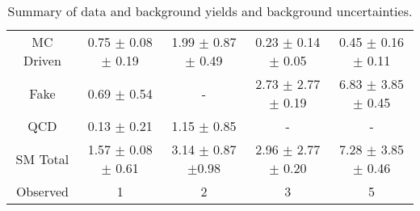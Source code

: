 \begin{table}[!Hhtb]
\begin{center}
\begin{tabular}{c|c|c|c|c}
\hline
\hline
		& \tauTau\binone & \tauTau\bintwo & \eTau & \muTau \\
\hline
MC Driven &  0.75 $\pm$ 0.08 $\pm$ 0.19 & 1.99 $\pm$ 0.87 $\pm$ 0.49  & 0.23 $\pm$ 0.14 $\pm$ 0.05 & 0.45 $\pm$ 0.16  $\pm$ 0.11\\
Fake      &     0.69 $\pm$ 0.54         &           -                 & 2.73 $\pm$ 2.77 $\pm$ 0.19 & 6.83 $\pm$ 3.85  $\pm$ 0.45\\
QCD       &     0.13 $\pm$ 0.21         &         1.15 $\pm$ 0.85     &             -              &            -       \\
\hline
SM Total  & 1.57 $\pm$ 0.08 $\pm$ 0.61  & 3.14  $\pm$ 0.87 $\pm$0.98  & 2.96 $\pm$ 2.77 $\pm$ 0.20 & 7.28 $\pm$ 3.85  $\pm$ 0.46\\
\hline
\hline
Observed   & 1     & 2     & 3   & 5 \\  
\hline
\hline
\end{tabular}
\caption{Summary of data and background yields and background uncertainties.}
\label{tbl:yieldSysSummary}
\end{center}
\end{table}
